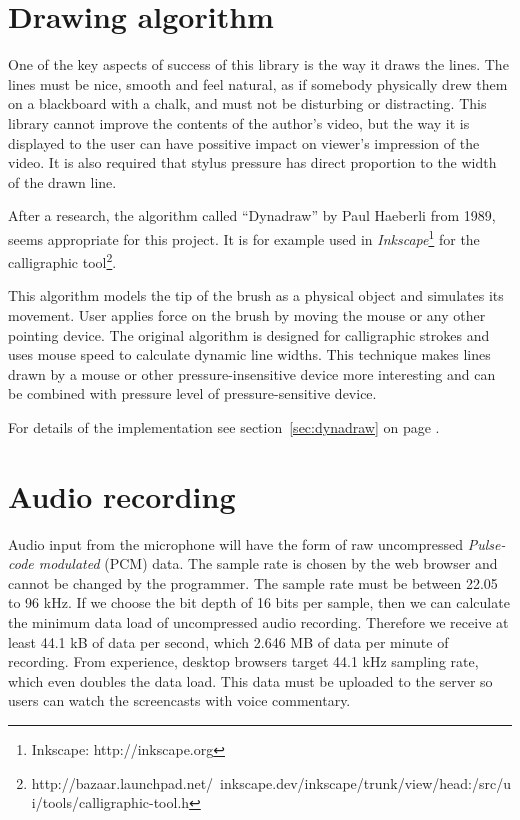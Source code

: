 \section{Drawing algorithm}
One of the key aspects of success of this library is the way it draws the lines. The lines must be nice, smooth and feel natural, as if somebody physically drew them on a blackboard with a chalk, and must not be disturbing or distracting. This library cannot improve the contents of the author's video, but the way it is displayed to the user can have possitive impact on viewer's impression of the video. It is also required that stylus pressure has direct proportion to the width of the drawn line.

After a research, the algorithm called ``Dynadraw'' by Paul Haeberli \cite{dyna_draw} from 1989, seems appropriate for this project. It is for example used in \textit{Inkscape}\footnote{Inkscape: http://inkscape.org} for the calligraphic tool\footnote{http://bazaar.launchpad.net/~inkscape.dev/inkscape/trunk/view/head:/src/ui/tools/calligraphic-tool.h}.

This algorithm models the tip of the brush as a physical object and simulates its movement. User applies force on the brush by moving the mouse or any other pointing device. The original algorithm is designed for calligraphic strokes and uses mouse speed to calculate dynamic line widths. This technique makes lines drawn by a mouse or other pressure-insensitive device more interesting and can be combined with pressure level of pressure-sensitive device.

For details of the implementation see section~\ref{sec:dynadraw} on page \pageref{sec:dynadraw}.








\section{Audio recording}
Audio input from the microphone will have the form of raw uncompressed \textit{Pulse-code modulated} (PCM) data\cite{mic_pcm}. The sample rate is chosen by the web browser and cannot be changed by the programmer. The sample rate must be between 22.05 to 96 kHz. If we choose the bit depth of 16 bits per sample, then we can calculate the minimum data load of uncompressed audio recording. Therefore we receive at least 44.1 kB of data per second, which 2.646 MB of data per minute of recording. From experience, desktop browsers target 44.1 kHz sampling rate, which even doubles the data load. This data must be uploaded to the server so users can watch the screencasts with voice commentary.

